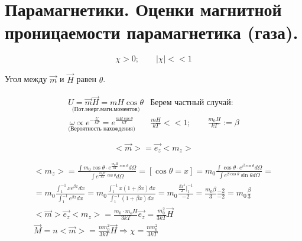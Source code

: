 \section{Парамагнетики. Оценки магнитной проницаемости парамагнетика (газа).}

\[
\chi>0; \qquad |\chi|<<1
\]

Угол между \( \vec{m} \) и \( \vec{H} \) равен \( \theta \).

\[
\begin{array}{l|l}
    \underset{\text{(Пот.энерг.магн.моментов)}}{U=\vec{m}\vec{H}=mH\cos\theta} & \text{Берем частный случай:} \\
    \underset{\text{(Вероятность нахождения)}}{\omega \propto e^{-\frac{U}{kT}}=e^{\frac{mH\cos\theta}{kT}} } & \frac{mH}{kT}<<1 ; \qquad \frac{m_0H}{kT}:=\beta  
\end{array}
\]

\[
<\vec{m}>=\vec{e_z}<m_z>
\]


\begin{gather*}
    <m_z>=\frac{\int m_0\cos\theta\cdot e^{\frac{m_0H}{kT}\cos\theta } d\Omega }{\int e^{\frac{m_0H}{kT}\cos\theta } d\Omega}=[\cos\theta=x]=m_0\frac{\int \cos\theta\cdot e^{\beta\cos\theta} d\Omega }{\int e^{\beta\cos\theta}\sin\theta d\Omega}= \\
    =m_0 \frac{\int_{1}^{-1} xe^{\beta x}dx}{\int_{1}^{-1} e^{\beta x}dx}= m_0 \frac{\int_{1}^{-1} x(1+\beta x)dx}{\int_{1}^{-1} (1+\beta x)dx }=m_0 \frac{\frac{\beta x^3}{2}|_1^{-1} }{-2}=\frac{m_0\beta}{3}\frac{-2}{-2}=m_0 \frac{\beta}{3} \\
    <\vec{m}>\vec{e_z}<m_z>=\frac{m_0\cdot m_o H}{3kT}\vec{e_z}=\frac{m_{0}^2}{3kT}\vec{H} \\
    \vec{M}=n<\vec{m}>=\frac{nm_0^2}{3kT}\vec{H}\Rightarrow \chi= \frac{nm_0^2}{3kT}
\end{gather*}
